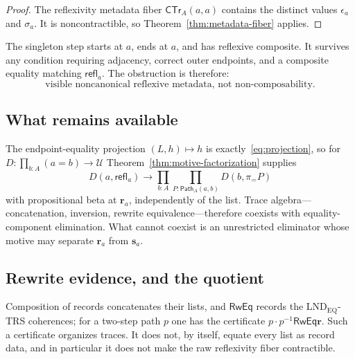 \documentclass[10pt,reqno]{amsart}
\newcommand{\U}{\mathcal U}
\newcommand{\PathTy}{\mathsf{Path}}
\newcommand{\refl}{\mathsf{refl}}
\newcommand{\proj}{\pi_{=}}
\begin{document}
\begin{proof}
The reflexivity metadata fiber
\(\mathsf{CTr}_A(a,a)\) contains the distinct values
\(\epsilon_a\) and \(\sigma_a\).  It is noncontractible, so
Theorem~\ref{thm:metadata-fiber} applies.
\end{proof}

The singleton step starts at \(a\), ends at \(a\), and has reflexive composite.
It survives any condition requiring adjacency, correct outer endpoints, and a
composite equality matching \(\refl_a\).  The obstruction is therefore:
\[
 \boxed{\text{visible noncanonical reflexive metadata, not
 non-composability.}}
\tag{9.9}\label{eq:boxed-obstruction}
\]

\subsection{What remains available}

The endpoint-equality projection \((L,h)\mapsto h\) is
exactly~\eqref{eq:projection}, so for \(D:\prod_{b:A}(a=b)\to\U\)
Theorem~\ref{thm:motive-factorization} supplies
\[
 D(a,\refl_a)\longrightarrow
 \prod_{b:A}\prod_{P:\PathTy_A(a,b)}D(b,\proj P)
\tag{9.10}\label{eq:trace-factored-j}
\]
with propositional beta at \(\mathbf r_a\), independently of the list.  Trace
algebra---concatenation, inversion, rewrite equivalence---therefore coexists
with equality-component elimination.  What cannot coexist is an unrestricted
eliminator whose motive may separate \(\mathbf r_a\) from \(\mathbf s_a\).

\subsection{Rewrite evidence, and the quotient}
\label{subsec:raw-versus-rweq}

Composition of records concatenates their lists, and \(\mathsf{RwEq}\) records
the LND\(_{\mathrm{EQ}}\)-TRS coherences; for a two-step path \(p\) one has the
certificate \(p\cdot p^{-1}\mathrel{\mathsf{RwEq}}\mathbf r\).  Such a
certificate organizes traces.  It does not, by itself, equate every list as
record data, and in particular it does not make the raw reflexivity fiber
contractible.
\end{document}
